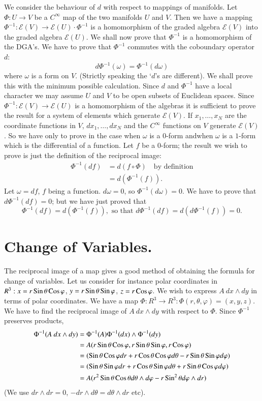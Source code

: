 We consider the behaviour of $d$ with respect to mappings of
manifolds. Let $\Phi:U\to V$ be a $C^{\infty}$ map of the two
manifolds $U$ and $V$. Then we have a mapping
$\Phi^{-1}:\mathscr{E}(V)\to \mathscr{E}(U)\cdot \Phi^{-1}$ is a
homomorphism of the graded algebra $\mathscr{E}(V)$ into the graded
algebra $\mathscr{E}(U)$. We shall now prove that $\Phi^{-1}$ is a
homomorphism of the DGA's. We have to prove that $\Phi^{-1}$ commutes
with the coboundary operator $d$: 
$$
d\Phi^{-1}(\omega)=\Phi^{-1}(d\omega)
$$
where $\omega$ is a form on $V$. (Strictly speaking the `$d$'s are
different). We shall prove this with the minimum possible
calculation. Since $d$ and $\Phi^{-1}$ have a local character we may
assume $U$ and $V$ to be open subsets of Euclidean spaces. Since
$\Phi^{-1}:\mathscr{E}(V)\to \mathscr{E}(U)$ is a homomorphism of the
algebras it is sufficient to prove the result for a system of elements
which generate $\mathscr{E}(V)$. If $x_{1},\ldots,x_{N}$ are the
coordinate functions in $V$, $dx_{1},\ldots,dx_{N}$ and the
$C^{\infty}$ functions on $V$ generate $\mathscr{E}(V)$. So we have
only to prove in the case when $\omega$ is a $0$-form
and\pageoriginale when $\omega$ is a $1$-form which is the
differential of a function. Let $f$ be a $0$-form; the result we wish
to prove is just the definition of the reciprocal image:
\begin{align*}
\Phi^{-1}(df) &= d(f\circ \Phi)\quad\text{by definition}\\
 &= d(\Phi^{-1}(f)).
\end{align*}
Let $\omega=df$, $f$ being a function. $d\omega=0$, so
$\Phi^{-1}(d\omega)=0$. We have to prove that $d\Phi^{-1}(df)=0$; but
we have just proved that 
$$
\Phi^{-1}(df)=d(\Phi^{-1}(f)),\text{ \  so that \ }
d\Phi^{-1}(df)=d(d\Phi^{-1}(f))=0. 
$$

\section*{Change of Variables.}

The reciprocal image of a map gives a good method of obtaining the
formula for change of variables. Let us consider for instance polar
coordinates in $R^{3}:x=r\operatorname{Sin} \theta\operatorname{Cos} \varphi$, $y=r\operatorname{Sin}
\theta\operatorname{Sin}\varphi$, $z=r\operatorname{Cos} \varphi$. We wish to express $A\ dx
\wedge dy$ in terms of polar coordinates. We have a map $\Phi:R^{3}\to
R^{3}:\Phi(r,\theta,\varphi)=(x,y,z)$. We have to find the reciprocal
image of $A\ dx\wedge dy$ with respect to $\Phi$. Since $\Phi^{-1}$
preserves products,
\begin{align*}
\Phi^{-1}(A\ dx\wedge dy) &=
\Phi^{-1}(A)\Phi^{-1}(dx)\wedge\Phi^{-1}(dy)\\
 &= A(r\operatorname{Sin}\theta\operatorname{Cos}\varphi, r\operatorname{Sin}\theta \operatorname{Sin}\varphi, r\operatorname{Cos}
\varphi)\\
&= (\operatorname{Sin}\theta\operatorname{Cos}\varphi dr+r\operatorname{Cos}\theta\operatorname{Cos}\varphi
d\theta-r\operatorname{Sin}\theta\operatorname{Sin}\varphi d\varphi)\\
&= (\operatorname{Sin}\theta\operatorname{Sin}\varphi dr+r\operatorname{Cos} \theta\operatorname{Sin}\varphi
d\theta+r\operatorname{Sin}\theta\operatorname{Cos}\varphi d\varphi)\\
&= A(r^{2}\operatorname{Sin}\theta\operatorname{Cos}\theta d\theta\wedge d\varphi-r\operatorname{Sin}^{2}\theta
d\varphi\wedge dr) 
\end{align*}
(We use $dr\wedge dr=0$, $-dr\wedge d\theta=d\theta\wedge dr$ etc).

